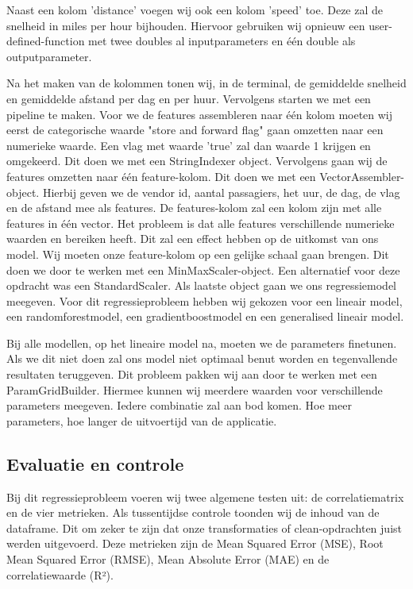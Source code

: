 \documentclass[a4paper,10pt,twoside]{report}
\begin{document}
Naast een kolom 'distance' voegen wij ook een kolom 'speed' toe. Deze zal de snelheid in miles per hour bijhouden. Hiervoor gebruiken wij opnieuw een user-defined-function met twee doubles al inputparameters en één double als outputparameter.


Na het maken van de kolommen tonen wij, in de terminal, de gemiddelde snelheid en gemiddelde afstand per dag en per huur. Vervolgens starten we met een pipeline te maken. Voor we de features assembleren naar één kolom moeten wij eerst de categorische waarde "store and forward flag" gaan omzetten naar een numerieke waarde. Een vlag met waarde 'true' zal dan waarde 1 krijgen en omgekeerd. Dit doen we met een StringIndexer object. Vervolgens gaan wij de features omzetten naar één feature-kolom. Dit doen we met een VectorAssembler-object. Hierbij geven we de vendor id, aantal passagiers, het uur, de dag, de vlag en de afstand mee als features. De features-kolom zal een kolom zijn met alle features in één vector. Het probleem is dat alle features verschillende numerieke waarden en bereiken heeft. Dit zal een effect hebben op de uitkomst van ons model. Wij moeten onze feature-kolom op een gelijke schaal gaan brengen. Dit doen we door te werken met een MinMaxScaler-object. Een alternatief voor deze opdracht was een StandardScaler. Als laatste object gaan we ons regressiemodel meegeven. Voor dit regressieprobleem hebben wij gekozen voor een lineair model, een randomforestmodel, een gradientboostmodel en een generalised lineair model.


Bij alle modellen, op het lineaire model na, moeten we de parameters finetunen. Als we dit niet doen zal ons model niet optimaal benut worden en tegenvallende resultaten teruggeven. Dit probleem pakken wij aan door te werken met een ParamGridBuilder. Hiermee kunnen wij meerdere waarden voor verschillende parameters meegeven. Iedere combinatie zal aan bod komen. Hoe meer parameters, hoe langer de uitvoertijd van de applicatie.

\subsection*{Evaluatie en controle}

Bij dit regressieprobleem voeren wij twee algemene testen uit: de correlatiematrix en de vier metrieken. Als tussentijdse controle toonden wij de inhoud van de dataframe. Dit om zeker te zijn dat onze transformaties of clean-opdrachten juist werden uitgevoerd. Deze metrieken zijn de Mean Squared Error (MSE), Root Mean Squared Error (RMSE), Mean Absolute Error (MAE) en de correlatiewaarde (R²).
\end{document}

